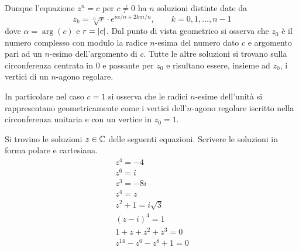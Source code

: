 Dunque l'equazione $z^n = c$ per $c\neq 0$ ha $n$ soluzioni distinte date
da
\[
z_k = \sqrt[n]{r} \cdot e^{i\alpha/n + 2k\pi i /n},
\qquad k=0,1, \dots, n-1
\]
dove $\alpha = \arg(c)$ e $r = {\left|c\right|}$.
Dal punto di vista geometrico si osserva che
$z_0$ è il numero complesso con modulo la radice $n$-esima del numero
dato $c$ e argomento pari ad un $n$-esimo dell'argomento di $c$.
Tutte le altre soluzioni si trovano sulla circonferenza centrata in $0$
e passante per $z_0$ e risultano essere, insieme ad $z_0$, i vertici
di un $n$-agono regolare.

In particolare nel caso $c=1$ si osserva che le radici $n$-esime dell'unità
si rappresentano geometricamente come i vertici dell'$n$-agono regolare iscritto
nella circonferenza unitaria e con un vertice in $z_0=1$.

\begin{exercise}
Si trovino le soluzioni $z \in {\mathbb C}$ delle seguenti equazioni.
Scrivere le soluzioni in forma polare e cartesiana.
\begin{gather*}
   z^4 = -4 \\
   z^6 = i\\
   z^3 = -8i \\
   z^4 = z\\
   z^2 + 1 = i\sqrt{3} \\
   (z-i)^4 = 1\\
   1 + z + z^2 + z^3 = 0\\
   z^{14} - z^6 - z^8 + 1 = 0
\end{gather*}
\end{exercise}

